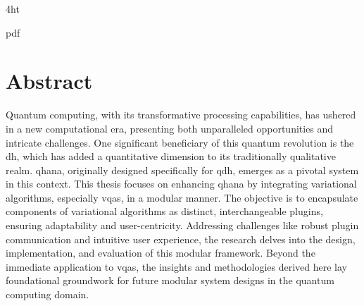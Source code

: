 \documentclass[
  a4paper,  %
  twoside,  %
  bibliography=totoc,
  headsepline,
  cleardoublepage=empty,
  parskip=half,
  draft=false
]{scrbook}
\begin{document}
\iftex4ht
  \Configure{$}{\PicMath}{\EndPicMath}{}

  {pdf}
  {%
  }
\fi



\Titelblatt

\pagestyle{preamble}
\renewcommand*{\chapterpagestyle}{preamble}




\section*{Abstract}
Quantum computing, with its transformative processing capabilities, has ushered in a new computational era, presenting both unparalleled opportunities and intricate challenges.
One significant beneficiary of this quantum revolution is the \gls{dh}, which has added a quantitative dimension to its traditionally qualitative realm.
\gls{qhana}, originally designed specifically for \gls{qdh}, emerges as a pivotal system in this context.
This thesis focuses on enhancing \gls{qhana} by integrating variational algorithms, especially \glspl{vqa}, in a modular manner.
The objective is to encapsulate components of variational algorithms as distinct, interchangeable plugins, ensuring adaptability and user-centricity.
Addressing challenges like robust plugin communication and intuitive user experience, the research delves into the design, implementation, and evaluation of this modular framework.
Beyond the immediate application to \glspl{vqa}, the insights and methodologies derived here lay foundational groundwork for future modular system designs in the quantum computing domain.
\end{document}
